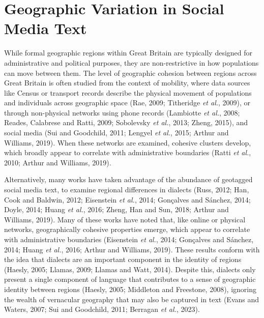 \documentclass[
]{article}
\begin{document}
\section{Geographic Variation in Social Media
Text}\label{sec-literature}

While formal geographic regions within Great Britain are typically
designed for administrative and political purposes, they are
non-restrictive in how populations can move between them. The level of
geographic cohesion between regions across Great Britain is often
studied from the context of mobility, where data sources like Census or
transport records describe the physical movement of populations and
individuals across geographic space (Rae, 2009; Titheridge \emph{et
al.}, 2009), or through non-physical networks using phone records
(Lambiotte \emph{et al.}, 2008; Reades, Calabrese and Ratti, 2009;
Sobolevsky \emph{et al.}, 2013; Zheng, 2015), and social media (Sui and
Goodchild, 2011; Lengyel \emph{et al.}, 2015; Arthur and Williams,
2019). When these networks are examined, cohesive clusters develop,
which broadly appear to correlate with administrative boundaries (Ratti
\emph{et al.}, 2010; Arthur and Williams, 2019).

Alternatively, many works have taken advantage of the abundance of
geotagged social media text, to examine regional differences in dialects
(Russ, 2012; Han, Cook and Baldwin, 2012; Eisenstein \emph{et al.},
2014; Gonçalves and Sánchez, 2014; Doyle, 2014; Huang \emph{et al.},
2016; Zheng, Han and Sun, 2018; Arthur and Williams, 2019). Many of
these works have noted that, like online or physical networks,
geographically cohesive properties emerge, which appear to correlate
with administrative boundaries (Eisenstein \emph{et al.}, 2014;
Gonçalves and Sánchez, 2014; Huang \emph{et al.}, 2016; Arthur and
Williams, 2019). These results conform with the idea that dialects are
an important component in the identity of regions (Haesly, 2005; Llamas,
2009; Llamas and Watt, 2014). Despite this, dialects only present a
single component of language that contributes to a sense of geographic
identity between regions (Haesly, 2005; Middleton and Freestone, 2008),
ignoring the wealth of vernacular geography that may also be captured in
text (Evans and Waters, 2007; Sui and Goodchild, 2011; Berragan \emph{et
al.}, 2023).
\end{document}
